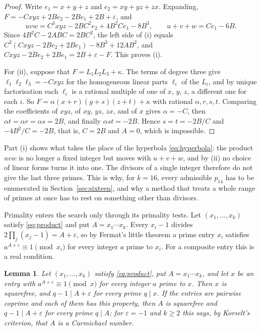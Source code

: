 \documentclass[11pt,reqno]{amsart}
\numberwithin{equation}{section}
\theoremstyle{plain}
\newtheorem{lemma}[theorem]{Lemma}
\theoremstyle{definition}
\theoremstyle{remark}
\begin{document}
\begin{proof}
Write $e_1=x+y+z$ and $e_2=xy+yz+zx$. Expanding,
$F=-Cxyz+2Be_2-2Be_1+2B+\varepsilon$, and
\[
  uvw=C^3xyz-2BC^2e_2+4B^2Ce_1-8B^3,\qquad u+v+w=Ce_1-6B .
\]
Since $4B^2C-2ABC=2BC^2$, the left side of (i) equals
$C^2(Cxyz-2Be_2+2Be_1)-8B^3+12AB^2$, and
$Cxyz-2Be_2+2Be_1=2B+\varepsilon-F$. This proves (i).

For (ii), suppose that $F=L_1L_2L_3+\kappa$. The terms of degree three
give $\ell_1\ell_2\ell_3=-Cxyz$ for the homogeneous linear parts
$\ell_i$ of the $L_i$, and by unique factorisation each $\ell_i$ is a
rational multiple of one of $x$, $y$, $z$, a different one for each
$i$. So $F=\alpha(x+r)(y+s)(z+t)+\kappa$ with rational $\alpha,r,s,t$.
Comparing the coefficients of $xyz$, of $xy$, $yz$, $zx$, and of $x$
gives $\alpha=-C$, then $\alpha t=\alpha r=\alpha s=2B$, and finally
$\alpha st=-2B$. Hence $s=t=-2B/C$ and $-4B^2/C=-2B$, that is,
$C=2B$ and $A=0$, which is impossible.
\end{proof}

Part (i) shows what takes the place of the hyperbola
\eqref{eq:hyperbola}: the product $uvw$ is no longer a fixed integer but
moves with $u+v+w$, and by (ii) no choice of linear forms turns it into
one. The divisors of a single integer therefore do not give the last
three primes. This is why, for $k=16$, every admissible $p_{14}$ has to
be enumerated in Section~\ref{sec:sixteen}, and why a method that
treats a whole range of primes at once has to rest on something other
than divisors.

Primality enters the search only through its primality tests. Let
$(x_1,\dots,x_k)$ satisfy \eqref{eq:product} and put
$A=x_1\cdots x_k$. Every $x_i-1$ divides
$2\prod_j(x_j-1)=A+\varepsilon$, so by Fermat's little theorem a prime
entry $x_i$ satisfies $a^{A+\varepsilon}\equiv1\pmod{x_i}$ for every
integer $a$ prime to $x_i$. For a composite entry this is a real
condition.

\begin{lemma}\label{lem:korselt}
Let $(x_1,\dots,x_k)$ satisfy \eqref{eq:product}, put
$A=x_1\cdots x_k$, and let $x$ be an entry with
$a^{A+\varepsilon}\equiv1\pmod x$ for every integer $a$ prime to $x$.
Then $x$ is squarefree, and $q-1\mid A+\varepsilon$ for every prime
$q\mid x$. If the entries are pairwise coprime and each of them has
this property, then $A$ is squarefree and $q-1\mid A+\varepsilon$ for
every prime $q\mid A$; for $\varepsilon=-1$ and $k\ge2$ this says, by
Korselt's criterion, that $A$ is a Carmichael number.
\end{lemma}
\end{document}
